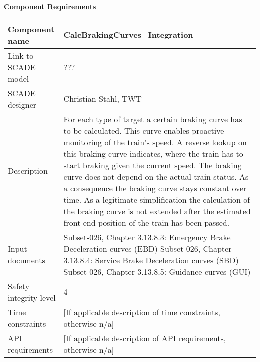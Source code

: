 
\paragraph{Component Requirements}

\begin{longtable}{p{}p{}}
\toprule
Component name			& CalcBrakingCurves\_Integration \\
\midrule
Link to SCADE model		& {\footnotesize \url{???}} \\
\midrule
SCADE designer			& Christian Stahl, TWT \\
\midrule
Description				& For each type of target a certain braking curve has to be calculated. This curve enables proactive monitoring of the train's speed. A reverse lookup on this braking curve indicates, where the train has to start braking given the current speed. The braking curve does not depend on the actual train status. As a consequence the braking curve stays constant over time. As a legitimate simplification the calculation of the braking curve is not extended after the estimated front end position of the train has been passed. \\
\midrule
Input documents	& 
Subset-026, Chapter 3.13.8.3: Emergency Brake Deceleration curves (EBD)\newline
Subset-026, Chapter 3.13.8.4: Service Brake Deceleration curves (SBD)\newline
Subset-026, Chapter 3.13.8.5: Guidance curves (GUI) \\
\midrule
Safety integrity level		& 4 \\
\midrule
Time constraints		& [If applicable description of time constraints, otherwise n/a] \\
\midrule
API requirements 		& [If applicable description of API requirements, otherwise n/a] \\
\bottomrule
\end{longtable}